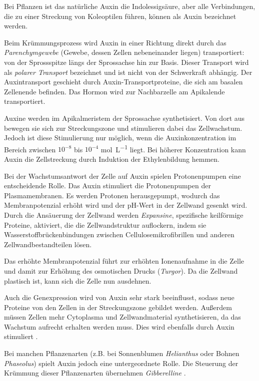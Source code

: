 \documentclass[
11pt, 
ngerman,
listof=totocnumbered,
oneside,
bibliography=totocnumbered,
abstracton
]{scrreprt}
\begin{document}
Bei Pflanzen ist das natürliche Auxin die Indolessigsäure, aber alle Verbindungen, die zu einer Streckung von Koleoptilen führen, können als Auxin bezeichnet werden.

Beim Krümmungsprozess wird Auxin in einer Richtung direkt durch das \emph{Parenchymgewebe} (Gewebe, dessen Zellen nebeneinander liegen) transportiert: von der Sprossspitze längs der Sprossachse hin zur Basis. Dieser Transport wird als \emph{polarer Transport} bezeichnet und ist nicht von der Schwerkraft abhängig. Der Auxintransport geschieht durch Auxin-Transportproteine, die sich am basalen Zellenende befinden. Das Hormon wird zur Nachbarzelle am Apikalende transportiert.

Auxine werden im Apikalmeristem der Sprossachse synthetisiert. Von dort aus bewegen sie sich zur Streckungszone und stimulieren dabei das Zellwachstum. Jedoch ist diese Stimulierung nur möglich, wenn die Auxinkonzentration im Bereich zwischen $10^{-8}$ bis $10^{-4}$ \si{\mole\per\L} liegt. Bei höherer Konzentration kann Auxin die Zellstreckung durch Induktion der Ethylenbildung hemmen.

Bei der Wachstumsantwort der Zelle auf Auxin spielen Protonenpumpen eine entscheidende Rolle. Das Auxin stimuliert die Protonenpumpen der Plasmamembranen. Es werden Protonen herausgepumpt, wodurch das Membranpotenzial erhöht wird und der pH-Wert in der Zellwand gesenkt wird. Durch die Ansäuerung der Zellwand werden \emph{Expansine}, spezifische keilförmige Proteine, aktiviert, die die Zellwandstruktur auflockern, indem sie Wasserstoffbrückenbindungen zwischen Cellulosemikrofibrillen und anderen Zellwandbestandteilen lösen. 

Das erhöhte Membranpotenzial führt zur erhöhten Ionenaufnahme in die Zelle und damit zur Erhöhung des osmotischen Drucks (\emph{Turgor}). Da die Zellwand plastisch ist, kann sich die Zelle nun ausdehnen. 

Auch die Genexpression wird von Auxin sehr stark beeinflusst, sodass neue Proteine von den Zellen in der Streckungszone gebildet werden. Außerdem müssen Zellen mehr Cytoplasma und Zellwandmaterial synthetisieren, da das Wachstum aufrecht erhalten werden muss. Dies wird ebenfalls durch Auxin stimuliert \parencite[1118--1120]{campbell}.

Bei manchen Pflanzenarten (z.B. bei Sonnenblumen \emph{Helianthus} oder Bohnen \emph{Phaseolus}) spielt Auxin jedoch eine untergeordnete Rolle. Die Steuerung der Krümmung dieser Pflanzenarten übernehmen \emph{Gibberelline} \parencite[502--503]{Nultsch}.
\end{document}

